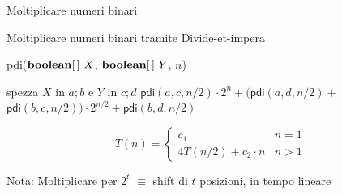 \begin{frame}{Moltiplicare numeri binari}
\end{frame}

\begin{frame}{Moltiplicare numeri binari tramite Divide-et-impera}
\begin{Procedure}
\caption[A]{\BOOLEAN[\,] \textsf{pdi}($\BOOLEAN[\,]\ X$, $\BOOLEAN[\,]\ Y$, \INTEGER $n$)}
{
  spezza $X$ in $a;b$ e $Y$ in $c;d$\;
  \Return $\textsf{pdi}(a,c, n/2)\cdot 2^n + (\textsf{pdi}(a,d, n/2)+$\; 
  \hspace{1.2cm} $\textsf{pdi}(b,c, n/2)) \cdot 2^{n/2} + \textsf{pdi}(b,d, n/2)$\;
}
\end{Procedure}
\[
T(n) = \left\{ 
  \begin{array}{ll}
     c_1 & n = 1\\
     4 T(n/2) + c_2 \cdot n & n > 1 
  \end{array} 
\right.
\]


\begin{mybox}
\alert{Nota}:
 Moltiplicare per $2^t$ $\equiv$ shift di $t$ posizioni, in tempo lineare
\end{mybox}

	
\end{frame}

